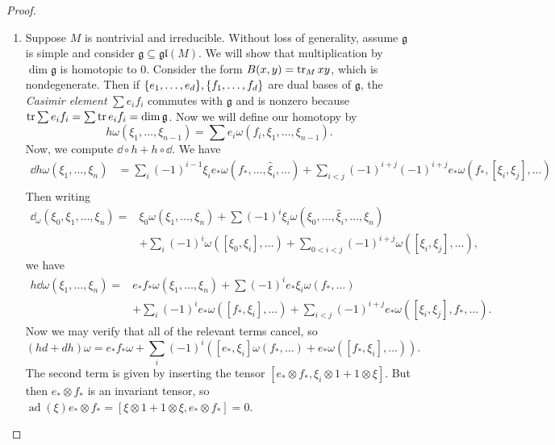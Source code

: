 \documentclass[leqno, openany]{memoir}
\theoremstyle{definition}
\theoremstyle{remark}
\theoremstyle{plain}
\theoremstyle{definition}
\theoremstyle{remark}
\newcommand{\mf}[1]{\mathfrak{#1}}
\newcommand{\wh}[1]{\widehat{#1}}
\DeclareMathOperator{\ad}{ad}
\begin{document}
\begin{proof}\leavevmode
    \begin{enumerate}
        \item Suppose $M$ is nontrivial and irreducible. Without loss of generality, assume $\mf{g}$ is simple and consider $\mf{g} \subseteq \mf{gl}(M)$. We will show that multiplication by $\dim \mf{g}$ is homotopic to $0$. Consider the form $B(x, y) = \tr_M xy$, which is nondegenerate. Then if $\qty{e_1, \ldots, e_d}, \qty{f_1, \ldots, f_d}$ are dual bases of $\mf{g}$, the \textit{Casimir element} $\sum e_i f_i$ commutes with $\mf{g}$ and is nonzero because $\tr \sum e_i f_i = \sum \tr e_i f_i = \dim \mf{g}$. Now we will define our homotopy by
            \[ h \omega (\xi_1, \ldots, \xi_{n-1}) = \sum e_i \omega (f_i, \xi_1, \ldots, \xi_{n-1}). \]
            Now, we compute $\dd \circ h + h \circ \dd$. We have
            \begin{align*}
                \dd h \omega (\xi_1, \ldots, \xi_n) &= \sum_i {(-1)}^{i-1} \xi_i e_* \omega (f_*, \ldots, \wh{\xi}_i, \ldots) + \sum_{i < j} {(-1)}^{i+j} {(-1)}^{i+j} e_* \omega (f_*, [\xi_i, \xi_j], \ldots) \\
            \end{align*}
            Then writing
            \begin{align*} 
                \dd_{\omega} (\xi_0, \xi_1, \ldots, \xi_n) ={} &\xi_0 \omega (\xi_1, \ldots, \xi_n) + \sum {(-1)}^i \xi_i \omega (\xi_0, \ldots, \wh{\xi}_i, \ldots, \xi_n)  \\
                                                               &+ \sum_i {(-1)}^i \omega ([\xi_0, \xi_i], \ldots) + \sum_{0 < i < j} {(-1)}^{i+j} \omega ([\xi_i, \xi_j], \ldots), 
            \end{align*}
            we have
            \begin{align*}
                h \dd{\omega}(\xi_1, \ldots, \xi_n) ={} &e_* f_* \omega (\xi_1, \ldots, \xi_n) + \sum {(-1)}^i e_* \xi_i \omega (f_*, \ldots) \\
                                                        &+ \sum_i {(-1)}^i e_* \omega ([f_*, \xi_i], \ldots) + \sum_{i < j} {(-1)}^{i+j} e_* \omega ([\xi_i, \xi_j], f_*, \ldots).
            \end{align*}
            Now we may verify that all of the relevant terms cancel, so 
            \[ (hd + dh) \omega = e_* f_* \omega + \sum_i {(-1)}^i ( [e_*, \xi_i] \omega (f_*, \ldots) + e_* \omega ([f_*, \xi_i], \ldots) ). \]
            The second term is given by inserting the tensor $[e_* \otimes f_*, \xi_i \otimes 1 + 1 \otimes \xi]$. But then $e_* \otimes f_*$ is an invariant tensor, so $\ad (\xi) e_* \otimes f_* = [\xi \otimes 1 + 1 \otimes \xi, e_* \otimes f_*] = 0$.

\end{enumerate}
\end{proof}
\end{document}
